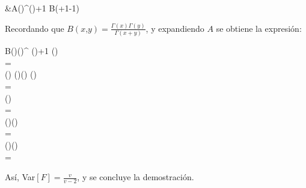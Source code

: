\begin{Demo}
\begin{enumerate}
\begin{longderivation}
      &A\left(\right)^{()+1}
      B\left(+1\text{,}-1\right)\\
    \end{longderivation}
    Recordando que $B(x\text{,}y)=\displaystyle\frac{\Gamma(x)\Gamma(y)}
    {\Gamma(x+y)}$, y expandiendo $A$ se obtiene la expresión:
    \begin{longderivation}
      {B\left(\text{,}\right)}\left(\right)^
      {()+1}
      {\Gamma\left(\right)}\\
      =\\
      \left(\right)
      {\Gamma\left(\right)\Gamma\left(\right)}
      {\Gamma\left(\right)}\\
      =\\
      \left(\right)\\
      =\\
      \left(\right)\left(\right)
      \\
      =\\
      \left(\right)\left(\right)\\
      =\\
    \end{longderivation}
    Así, Var$[F]=\displaystyle\frac{v}{v-2}$, y se concluye la demostración. 
  \end{enumerate}
\end{Demo}